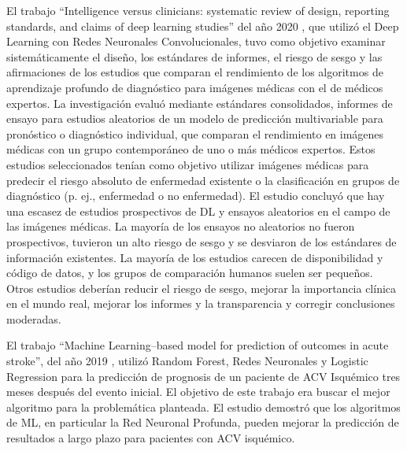 \par El trabajo “Intelligence versus clinicians: systematic review of design, reporting standards, and claims of deep learning studies” del año 2020 \cite{Nagendran2020}, que utilizó el Deep Learning con Redes Neuronales Convolucionales, tuvo como objetivo examinar sistemáticamente el diseño, los estándares de informes, el riesgo de sesgo y las afirmaciones de los estudios que comparan el rendimiento de los algoritmos de aprendizaje profundo de diagnóstico para imágenes médicas con el de médicos expertos. La investigación evaluó mediante estándares consolidados, informes de ensayo para estudios aleatorios de un modelo de predicción multivariable para pronóstico o diagnóstico individual, que comparan el rendimiento en imágenes médicas con un grupo contemporáneo de uno o más médicos expertos. Estos estudios seleccionados tenían como objetivo utilizar imágenes médicas para predecir el riesgo absoluto de enfermedad existente o la clasificación en grupos de diagnóstico (p. ej., enfermedad o no enfermedad). El estudio concluyó que hay una escasez de estudios prospectivos de DL y ensayos aleatorios en el campo de las imágenes médicas. La mayoría de los ensayos no aleatorios no fueron prospectivos, tuvieron un alto riesgo de sesgo y se desviaron de los estándares de información existentes. La mayoría de los estudios carecen de disponibilidad y código de datos, y los grupos de comparación humanos suelen ser pequeños. Otros estudios deberían reducir el riesgo de sesgo, mejorar la importancia clínica en el mundo real, mejorar los informes y la transparencia y corregir conclusiones moderadas.\\

\par El trabajo “Machine Learning–based model for prediction of outcomes in acute stroke”, del año 2019 \cite{Heo2019}, utilizó Random Forest, Redes Neuronales y Logistic Regression para la predicción de prognosis de un paciente de ACV Isquémico tres meses después del evento inicial. El objetivo de este trabajo era buscar el mejor algoritmo para la problemática planteada.
El estudio demostró que los algoritmos de ML, en particular la Red Neuronal Profunda, pueden mejorar la predicción de resultados a largo plazo para pacientes con ACV isquémico.\\

